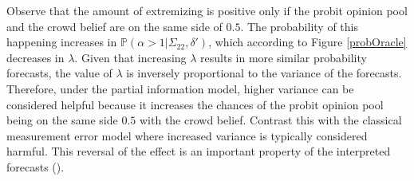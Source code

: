 \documentclass[11pt]{article}
\renewcommand{\P}{\mathbb{P}}
\theoremstyle{definition}
\theoremstyle{definition}
\begin{document}
Observe that the amount of extremizing is positive only if the probit opinion pool and the crowd belief are on the same side of $0.5$. The probability of this happening increases in $\P(\alpha > 1 | \Sigma_{22}, \delta')$, which according to Figure \ref{probOracle} decreases in $\lambda$. Given that increasing $\lambda$ results in more similar probability forecasts, the value of $\lambda$ is inversely proportional to the variance of the forecasts. Therefore,  under the partial information model, higher variance can be considered helpful because it increases the chances of the probit opinion pool being on the same side $0.5$ with the crowd belief. Contrast this with the classical measurement error model where increased variance is typically considered harmful. This reversal of the effect is an important property of the interpreted forecasts (\citet{hong2009interpreted}). 

\end{document}
